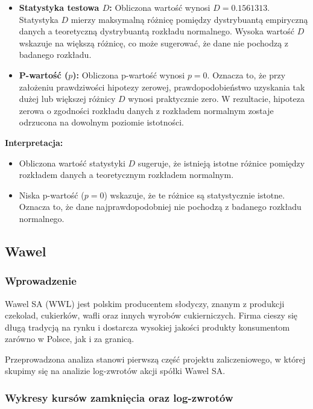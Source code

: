 \documentclass[a4paper,11pt]{article}
\begin{document}
\begin{itemize}
    \item \textbf{Statystyka testowa \( D \):} Obliczona wartość wynosi \( D = 0.1561313 \). Statystyka \( D \) mierzy maksymalną różnicę pomiędzy dystrybuantą empiryczną danych a teoretyczną dystrybuantą rozkładu normalnego. Wysoka wartość \( D \) wskazuje na większą różnicę, co może sugerować, że dane nie pochodzą z badanego rozkładu.
    \item \textbf{P-wartość (\( p \)):} Obliczona p-wartość wynosi \( p = 0 \). Oznacza to, że przy założeniu prawdziwości hipotezy zerowej, prawdopodobieństwo uzyskania tak dużej lub większej różnicy \( D \) wynosi praktycznie zero. W rezultacie, hipoteza zerowa o zgodności rozkładu danych z rozkładem normalnym zostaje odrzucona na dowolnym poziomie istotności.
\end{itemize}

\textbf{Interpretacja:}
\begin{itemize}
    \item Obliczona wartość statystyki \( D \) sugeruje, że istnieją istotne różnice pomiędzy rozkładem danych a teoretycznym rozkładem normalnym. 
    \item Niska p-wartość (\( p = 0 \)) wskazuje, że te różnice są statystycznie istotne. Oznacza to, że dane najprawdopodobniej nie pochodzą z badanego rozkładu normalnego.
\end{itemize}

\subsection{Wawel}

\subsubsection{Wprowadzenie}
Wawel SA (WWL) jest polskim producentem słodyczy, znanym z produkcji czekolad, cukierków, wafli oraz innych wyrobów cukierniczych. Firma cieszy się długą tradycją na rynku i dostarcza wysokiej jakości produkty konsumentom zarówno w Polsce, jak i za granicą.

Przeprowadzona analiza stanowi pierwszą część projektu zaliczeniowego, w której skupimy się na analizie log-zwrotów akcji spółki Wawel SA.

\subsubsection{Wykresy kursów zamknięcia oraz log-zwrotów}
\end{document}
